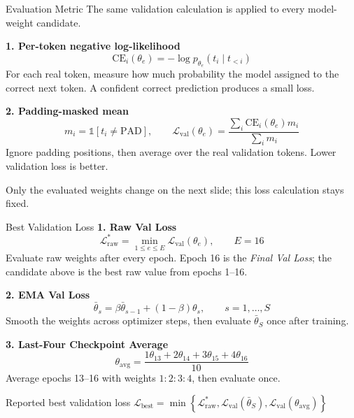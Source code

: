 \documentclass[aspectratio=169,11pt]{beamer}
\begin{document}
\begin{frame}{Evaluation Metric}
  \small
  The same validation calculation is applied to every model-weight candidate.

  \vspace{0.45cm}
  \textbf{1. Per-token negative log-likelihood}
  \[
    \mathrm{CE}_i(\theta_e)=-\log p_{\theta_e}(t_i\mid t_{<i})
  \]
  For each real token, measure how much probability the model assigned to the
  correct next token. A confident correct prediction produces a small loss.

  \vspace{0.4cm}
  \textbf{2. Padding-masked mean}
  \[
    m_i=\mathbb{1}[t_i\neq\mathrm{PAD}],
    \qquad
    \mathcal{L}_{\mathrm{val}}(\theta_e)=
    \frac{\sum_i \mathrm{CE}_i(\theta_e)m_i}{\sum_i m_i}
  \]
  Ignore padding positions, then average over the real validation tokens.
  Lower validation loss is better.

  \vspace{0.3cm}
  \begin{center}
    Only the evaluated weights change on the next slide; this loss calculation stays fixed.
  \end{center}
\end{frame}

\begin{frame}{Best Validation Loss}
  \small
  \textbf{1. Raw Val Loss}
  \[
    \mathcal{L}_{\mathrm{raw}}^{*}
      =\min_{1\le e\le E}\mathcal{L}_{\mathrm{val}}(\theta_e),
    \qquad E=16
  \]
  Evaluate raw weights after every epoch. Epoch 16 is the \emph{Final Val Loss};
  the candidate above is the best raw value from epochs 1--16.

  \vspace{0.1cm}
  \textbf{2. EMA Val Loss}
  \[
    \bar\theta_s=\beta\bar\theta_{s-1}+(1-\beta)\theta_s,
    \qquad s=1,\ldots,S
  \]
  Smooth the weights across optimizer steps, then evaluate $\bar\theta_S$ once after training.

  \vspace{0.1cm}
  \textbf{3. Last-Four Checkpoint Average}
  \[
    \theta_{\mathrm{avg}}
      =\frac{1\theta_{13}+2\theta_{14}+3\theta_{15}+4\theta_{16}}{10}
  \]
  Average epochs 13--16 with weights $1{:}2{:}3{:}4$, then evaluate once.

  \vspace{0.1cm}
  \begin{block}{Reported best validation loss}
    \centering
    \(\displaystyle
      \mathcal{L}_{\mathrm{best}}=\min\!\left\{
      \mathcal{L}_{\mathrm{raw}}^{*},
      \mathcal{L}_{\mathrm{val}}(\bar\theta_S),
      \mathcal{L}_{\mathrm{val}}(\theta_{\mathrm{avg}})
      \right\}
    \)
  \end{block}
\end{frame}
\end{document}

